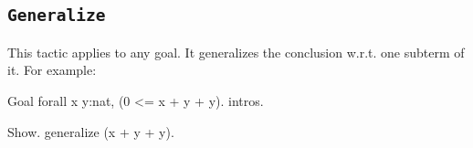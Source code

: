 %
%

\subsection{\tt Generalize \term}
\label{Generalize}

This tactic applies to any goal. It generalizes the conclusion w.r.t.
one subterm of it. For example:

\begin{coq_eval}
Goal forall x y:nat, (0 <= x + y + y).
intros.
\end{coq_eval}
\begin{coq_example}
Show.
generalize (x + y + y).
\end{coq_example}

